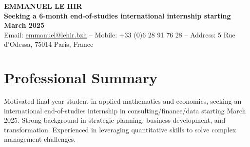 \documentclass[a4paper,9pt]{extarticle}
\begin{document}
\pagestyle{empty}

\begin{center}
\vspace*{-15pt}
\textbf{\LARGE EMMANUEL LE HIR}\\
\vspace{5pt}
\textbf{Seeking a 6-month end-of-studies international internship starting March 2025} \\
\vspace{3pt}
Email: \href{mailto:emmanuel@lehir.bzh}{emmanuel@lehir.bzh} -- Mobile: +33 (0)6 28 91 76 28 -- Address: 5 Rue d'Odessa, 75014 Paris, France
\end{center}


\section*{\faUser \hspace{0.1em} Professional Summary}
Motivated final year student in applied mathematics and economics, seeking an international end-of-studies internship in consulting/finance/data starting March 2025. Strong background in strategic planning, business development, and transformation. Experienced in leveraging quantitative skills to solve complex management challenges.

\vspace{6pt}

\end{document}
